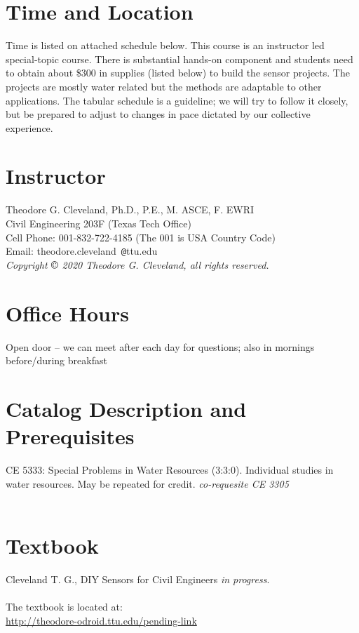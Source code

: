 \documentclass[12pt]{article}
\begin{document}
\section*{ }
\section*{Time and Location}
Time is listed on attached schedule below. 
This course is an instructor led special-topic course.  There is substantial hands-on component and students need to obtain about \$300 in supplies (listed below) to build the sensor projects.
The projects are mostly water related but the methods are adaptable to other applications.
The tabular schedule is a guideline; we will try to follow it closely, but be prepared to adjust to changes in pace dictated by our collective experience.
\section*{Instructor}
Theodore G. Cleveland, Ph.D., P.E., M. ASCE, F. EWRI\\
Civil Engineering 203F (Texas Tech Office)\\
Cell Phone: 001-832-722-4185  (The 001 is USA Country Code)\\
Email: theodore.cleveland~\texttt{@}ttu.edu\\
\textsl{Copyright $\copyright$ 2020 Theodore G. Cleveland, all rights reserved.} 
\section*{Office Hours}
Open door -- we can meet after each day for questions; also in mornings before/during breakfast\\
\section*{Catalog Description and Prerequisites}
CE 5333: Special Problems in Water Resources (3:3:0). Individual studies in water resources. May be repeated for credit.
\textsl{co-requesite CE 3305} \\
~\\

\section*{Textbook}
Cleveland T. G., DIY Sensors for Civil Engineers  \textsl{in progress}. \\ ~\\ The textbook is located at: \\
\url{http://theodore-odroid.ttu.edu/pending-link}
\end{document}
